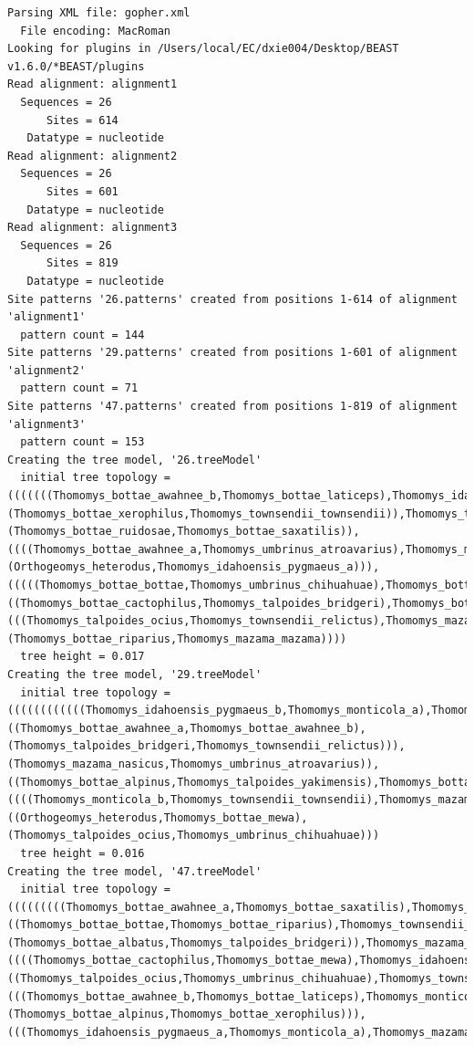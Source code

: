 \documentclass[12pt]{article}
\begin{document}
{\begin{verbatim}
Parsing XML file: gopher.xml
  File encoding: MacRoman
Looking for plugins in /Users/local/EC/dxie004/Desktop/BEAST v1.6.0/*BEAST/plugins
Read alignment: alignment1
  Sequences = 26
      Sites = 614
   Datatype = nucleotide
Read alignment: alignment2
  Sequences = 26
      Sites = 601
   Datatype = nucleotide
Read alignment: alignment3
  Sequences = 26
      Sites = 819
   Datatype = nucleotide
Site patterns '26.patterns' created from positions 1-614 of alignment 'alignment1'
  pattern count = 144
Site patterns '29.patterns' created from positions 1-601 of alignment 'alignment2'
  pattern count = 71
Site patterns '47.patterns' created from positions 1-819 of alignment 'alignment3'
  pattern count = 153
Creating the tree model, '26.treeModel'
  initial tree topology = (((((((Thomomys_bottae_awahnee_b,Thomomys_bottae_laticeps),Thomomys_idahoensis_pygmaeus_b),(Thomomys_bottae_xerophilus,Thomomys_townsendii_townsendii)),Thomomys_talpoides_yakimensis),(Thomomys_bottae_ruidosae,Thomomys_bottae_saxatilis)),((((Thomomys_bottae_awahnee_a,Thomomys_umbrinus_atroavarius),Thomomys_monticola_b),Thomomys_monticola_a),(Orthogeomys_heterodus,Thomomys_idahoensis_pygmaeus_a))),(((((Thomomys_bottae_bottae,Thomomys_umbrinus_chihuahuae),Thomomys_bottae_albatus),Thomomys_bottae_alpinus),((Thomomys_bottae_cactophilus,Thomomys_talpoides_bridgeri),Thomomys_bottae_mewa)),(((Thomomys_talpoides_ocius,Thomomys_townsendii_relictus),Thomomys_mazama_nasicus),(Thomomys_bottae_riparius,Thomomys_mazama_mazama))))
  tree height = 0.017
Creating the tree model, '29.treeModel'
  initial tree topology = ((((((((((((Thomomys_idahoensis_pygmaeus_b,Thomomys_monticola_a),Thomomys_idahoensis_pygmaeus_a),Thomomys_bottae_xerophilus),Thomomys_bottae_ruidosae),Thomomys_bottae_laticeps),Thomomys_bottae_bottae),((Thomomys_bottae_awahnee_a,Thomomys_bottae_awahnee_b),(Thomomys_talpoides_bridgeri,Thomomys_townsendii_relictus))),(Thomomys_mazama_nasicus,Thomomys_umbrinus_atroavarius)),((Thomomys_bottae_alpinus,Thomomys_talpoides_yakimensis),Thomomys_bottae_albatus)),Thomomys_bottae_riparius),((((Thomomys_monticola_b,Thomomys_townsendii_townsendii),Thomomys_mazama_mazama),Thomomys_bottae_cactophilus),Thomomys_bottae_saxatilis)),((Orthogeomys_heterodus,Thomomys_bottae_mewa),(Thomomys_talpoides_ocius,Thomomys_umbrinus_chihuahuae)))
  tree height = 0.016
Creating the tree model, '47.treeModel'
  initial tree topology = (((((((((Thomomys_bottae_awahnee_a,Thomomys_bottae_saxatilis),Thomomys_talpoides_yakimensis),((Thomomys_bottae_bottae,Thomomys_bottae_riparius),Thomomys_townsendii_townsendii)),(Thomomys_bottae_albatus,Thomomys_talpoides_bridgeri)),Thomomys_mazama_mazama),((((Thomomys_bottae_cactophilus,Thomomys_bottae_mewa),Thomomys_idahoensis_pygmaeus_b),((Thomomys_talpoides_ocius,Thomomys_umbrinus_chihuahuae),Thomomys_townsendii_relictus)),Thomomys_umbrinus_atroavarius)),Thomomys_bottae_ruidosae),(((Thomomys_bottae_awahnee_b,Thomomys_bottae_laticeps),Thomomys_monticola_b),(Thomomys_bottae_alpinus,Thomomys_bottae_xerophilus))),(((Thomomys_idahoensis_pygmaeus_a,Thomomys_monticola_a),Thomomys_mazama_nasicus),Orthogeomys_heterodus))

\end{verbatim}}
\end{document}
